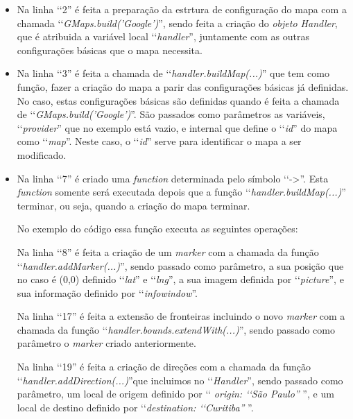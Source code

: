 \begin{itemize}

 \item Na linha ‘‘2'' é feita a preparação da estrtura de configuração do mapa com a chamada 
 ‘‘\emph{GMaps.build('Google')}'', sendo feita a criação do \emph{objeto Handler}, que é atribuida a 
 variável local ‘‘\emph{handler}'', juntamente com as outras configurações básicas que o mapa necessita.
 
 \item Na linha ‘‘3'' é feita a chamada de ‘‘\emph{handler.buildMap(...)}'' que tem como função, fazer a 
 criação do mapa a parir das configurações básicas já definidas. No caso, estas configurações básicas
 são definidas quando é feita a chamada de ‘‘\emph{GMaps.build('Google')}''. São passados como parâmetros
 as variáveis, ‘‘\emph{provider}'' que no exemplo está vazio, e internal que define o ‘‘\emph{id}'' do
 mapa como ‘‘\emph{map}''. Neste caso, o ‘‘\emph{id}'' serve para identificar o mapa a ser modificado.
 
 \item Na linha ‘‘7'' é criado uma \emph{function} determinada pelo símbolo ‘‘->''. Esta \emph{function}
 somente será executada depois que a função ‘‘\emph{handler.buildMap(...)}'' terminar, ou seja, quando a
 criação do mapa terminar.
 
 No exemplo do código essa função executa as seguintes operações:
 
  \subitem Na linha ‘‘8'' é feita a criação de um \emph{marker} com a chamada da função 
  ‘‘\emph{handler.addMarker(...)}'', sendo passado como parâmetro, a sua posição que no caso é (0,0) 
  definido ‘‘\emph{lat}'' e ‘‘\emph{lng}'', a sua imagem definida por ‘‘\emph{picture}'', e sua informação 
  definido por ‘‘\emph{infowindow}''.
 
  \subitem Na linha ‘‘17'' é feita a extensão de fronteiras incluindo o novo \emph{marker} com a chamada 
  da função ‘‘\emph{handler.bounds.extendWith(...)}'', sendo passado como parâmetro o \emph{marker} criado
  anteriormente.
 
  \subitem Na linha ‘‘19'' é feita a criação de direções com a chamada da função 
  ‘‘\emph{handler.addDirection(...)}''que incluimos no ‘‘\emph{Handler}'', sendo passado como parâmetro, um 
  local de origem definido por ‘‘\emph{ origin: ‘‘São Paulo''} '', e um local de destino definido por 
  ‘‘\emph{destination: ‘‘Curitiba''} ''.
 
\end{itemize}

